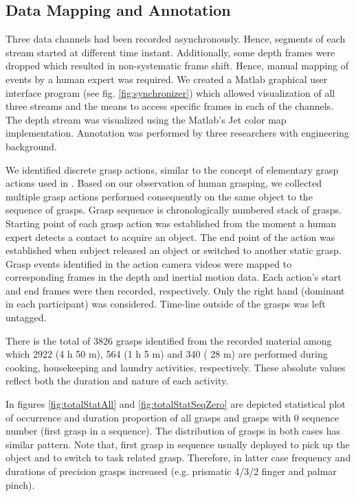 \documentclass[journal]{IEEEtran}
\begin{document}
\subsection{Data Mapping and Annotation}

Three data channels had been recorded asynchronously. Hence, segments of each stream started at different time instant. Additionally, some depth frames were dropped which resulted in non-systematic frame shift. Hence, manual mapping of events by a human expert was required. We created a Matlab graphical user interface program (see fig. \ref{fig:synchronizer}) which allowed visualization of all three streams and the means to access specific frames in each of the channels. The depth stream was visualized using the Matlab’s Jet color map implementation. Annotation was performed by three researchers with engineering background.

We identified discrete grasp actions, similar to the concept of elementary grasp actions used in \cite{IEEEhowto:vergera}.  
Based on our observation of human grasping, we collected multiple grasp actions performed consequently on the same object to the sequence of grasps. Grasp sequence is chronologically numbered stack of grasps.  Starting point of each grasp action was established from the moment a human expert detects a contact to acquire an object. The end point of the action was established when subject released an object or switched to another static grasp. Grasp events identified in the action camera videos were mapped to corresponding frames in the depth and inertial motion data. Each action’s start and end frames were then recorded, respectively. Only the right hand (dominant in each participant) was considered. Time-line outside of the grasps was left untagged. 



There is the total of 3826 grasps identified from the recorded material among which 2922 (4 h 50 m), 564 (1 h 5 m) and 340 ( 28 m) are performed during cooking, housekeeping and laundry activities, respectively. These absolute values reflect both the duration and nature of each activity.

In figures \ref{fig:totalStatAll} and \ref{fig:totalStatSeqZero} are depicted statistical plot of occurrence and duration proportion of all grasps and grasps with 0 sequence number (first grasp in a sequence). The distribution of grasps in both cases has similar pattern. Note that, first grasp in sequence usually deployed to pick up the object and to switch to task related grasp. Therefore, in latter case frequency and durations of precision grasps increased (e.g. prismatic 4/3/2 finger and palmar pinch).
\end{document}
